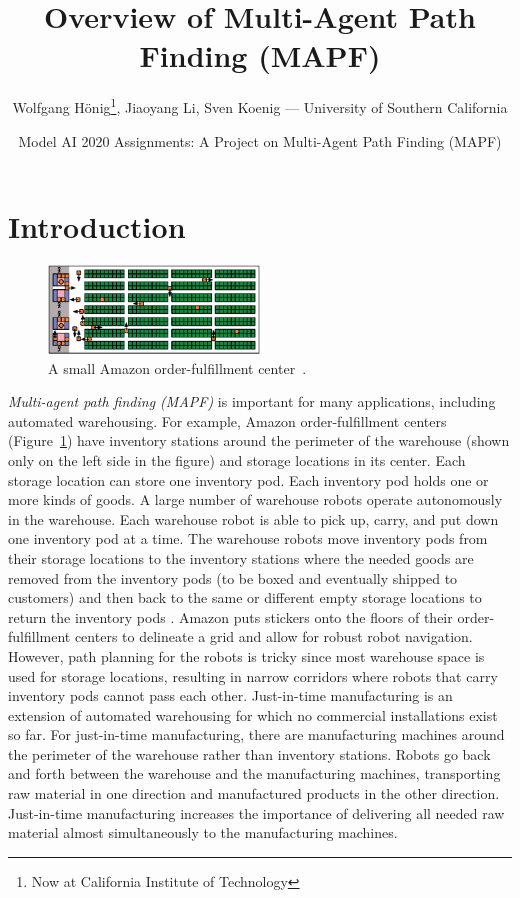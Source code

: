 \documentclass[11pt]{article}
\title{Overview of Multi-Agent Path Finding (MAPF)}
\author{Wolfgang Hönig\footnote{Now at California Institute of Technology}, Jiaoyang Li, Sven Koenig --- University of Southern California}
\date{Model AI 2020 Assignments: A Project on Multi-Agent Path Finding (MAPF)}
\begin{document}
\maketitle

\section{Introduction \label{intro}}

\begin{figure}[ht]
\centering
\includegraphics[width=0.5\textwidth]{images/amazon-warehouse.png}
\caption{A small Amazon order-fulfillment center~\protect\cite{kiva}.}\label{fig:kiva}
\end{figure}

\emph{Multi-agent path finding (MAPF)} is important for many applications, including automated warehousing. For example, Amazon order-fulfillment centers (Figure~\ref{fig:kiva}) have inventory stations around the perimeter of the warehouse (shown only on the left side in the figure) and storage locations in its center. Each storage location can store one inventory pod. Each inventory pod holds one or more kinds of goods. A large number of warehouse robots operate autonomously in the warehouse. Each warehouse robot is able to pick up, carry, and put down one inventory pod at a time. The warehouse robots move inventory pods from their storage locations to the inventory stations where the needed goods are removed from the inventory pods (to be boxed and eventually shipped to customers) and then back to the same or different empty storage locations to return the inventory pods \cite{kiva}. Amazon puts stickers onto the floors of their order-fulfillment centers to delineate a grid and allow for robust robot navigation. However, path planning for the robots is tricky since most warehouse space is used for storage locations, resulting in narrow corridors where robots that carry inventory pods cannot pass each other. Just-in-time manufacturing is an extension of automated warehousing for which no commercial installations exist so far. For just-in-time manufacturing, there are manufacturing machines around the perimeter of the warehouse rather than inventory stations. Robots go back and forth between the warehouse and the manufacturing machines, transporting raw material in one direction and manufactured products in the other direction. Just-in-time manufacturing increases the importance of delivering all needed raw material almost simultaneously to the manufacturing machines.
\end{document}
